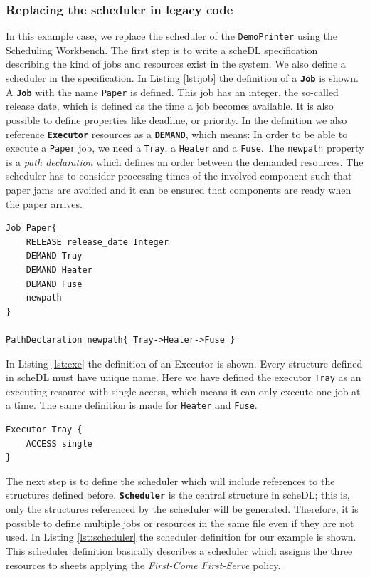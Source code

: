 	\subsubsection{Replacing the scheduler in legacy code}
	In this example case, we replace the scheduler of the \texttt{DemoPrinter}
	using the Scheduling Workbench. The first step is to write a \textsf{scheDL} specification
	describing the kind of jobs and resources exist in the system. We also
	define a scheduler in the specification. In Listing \ref{lst:job} the definition
	of a \texttt{\textbf{Job}} is shown. A \texttt{\textbf{Job}} with the name \texttt{Paper} is
	defined. This job has an integer, the so-called release date, which is defined
	as the time a job becomes available. It is also possible to define properties like deadline, or
	priority. In the definition we also reference \texttt{\textbf{Executor}}
	resources as a \texttt{\textbf{DEMAND}}, which means: In order to be able to execute a \texttt{Paper} job, we
	need a \texttt{Tray}, a \texttt{Heater} and a \texttt{Fuse}. The \texttt{newpath} property is a \emph{path
	declaration} which defines an order between the demanded resources. The scheduler has to consider processing times of the involved component such that paper jams are avoided and it can be ensured that components are ready when the paper arrives.
\begin{lstlisting}[caption={Job definition.}, label={lst:job}]
Job Paper{
	RELEASE release_date Integer
	DEMAND Tray
	DEMAND Heater
	DEMAND Fuse
	newpath
}

PathDeclaration newpath{ Tray->Heater->Fuse }
\end{lstlisting}

	In Listing \ref{lst:exe} the definition of an Executor is shown. Every structure
	defined in \textsf{scheDL} must have unique name. Here we
	have defined the executor \texttt{Tray} as an executing resource with single
	access, which means it can only execute one job at a time. The same definition
	is made for \texttt{Heater} and \texttt{Fuse}.
	
\begin{lstlisting}[caption={Executor definition.}, label={lst:exe}] 
Executor Tray { 
	ACCESS single 
}
\end{lstlisting}
	The next step is to define the scheduler which will include references to the
	structures defined before. \texttt{\textbf{Scheduler}} is the central structure
	in \textsf{scheDL}; this is, only the structures referenced by the scheduler
	will be generated. Therefore, it is possible to define multiple jobs or
	resources in the same file even if they are not used. In Listing
	\ref{lst:scheduler} the scheduler definition for our example is shown. This
	scheduler definition basically describes a scheduler which assigns the three resources to sheets applying the \emph{First-Come First-Serve} policy.
	
